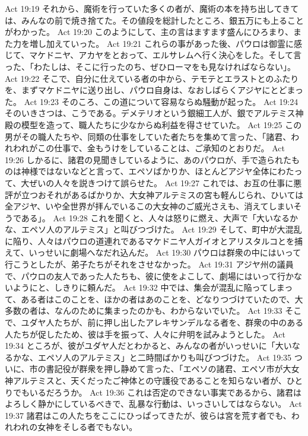 Act 19:19  それから、魔術を行っていた多くの者が、魔術の本を持ち出してきては、みんなの前で焼き捨てた。その値段を総計したところ、銀五万にも上ることがわかった。
Act 19:20  このようにして、主の言はますます盛んにひろまり、また力を増し加えていった。
Act 19:21  これらの事があった後、パウロは御霊に感じて、マケドニヤ、アカヤをとおって、エルサレムへ行く決心をした。そして言った、「わたしは、そこに行ったのち、ぜひローマをも見なければならない」。
Act 19:22  そこで、自分に仕えている者の中から、テモテとエラストとのふたりを、まずマケドニヤに送り出し、パウロ自身は、なおしばらくアジヤにとどまった。
Act 19:23  そのころ、この道について容易ならぬ騒動が起った。
Act 19:24  そのいきさつは、こうである。デメテリオという銀細工人が、銀でアルテミス神殿の模型を造って、職人たちに少なからぬ利益を得させていた。
Act 19:25  この男がその職人たちや、同類の仕事をしていた者たちを集めて言った、「諸君、われわれがこの仕事で、金もうけをしていることは、ご承知のとおりだ。
Act 19:26  しかるに、諸君の見聞きしているように、あのパウロが、手で造られたものは神様ではないなどと言って、エペソばかりか、ほとんどアジヤ全体にわたって、大ぜいの人々を説きつけて誤らせた。
Act 19:27  これでは、お互の仕事に悪評が立つおそれがあるばかりか、大女神アルテミスの宮も軽んじられ、ひいては全アジヤ、いや全世界が拝んでいるこの大女神のご威光さえも、消えてしまいそうである」。
Act 19:28  これを聞くと、人々は怒りに燃え、大声で「大いなるかな、エペソ人のアルテミス」と叫びつづけた。
Act 19:29  そして、町中が大混乱に陥り、人々はパウロの道連れであるマケドニヤ人ガイオとアリスタルコとを捕えて、いっせいに劇場へなだれ込んだ。
Act 19:30  パウロは群衆の中にはいって行こうとしたが、弟子たちがそれをさせなかった。
Act 19:31  アジヤ州の議員で、パウロの友人であった人たちも、彼に使をよこして、劇場にはいって行かないようにと、しきりに頼んだ。
Act 19:32  中では、集会が混乱に陥ってしまって、ある者はこのことを、ほかの者はあのことを、どなりつづけていたので、大多数の者は、なんのために集まったのかも、わからないでいた。
Act 19:33  そこで、ユダヤ人たちが、前に押し出したアレキサンデルなる者を、群衆の中のある人たちが促したため、彼は手を振って、人々に弁明を試みようとした。
Act 19:34  ところが、彼がユダヤ人だとわかると、みんなの者がいっせいに「大いなるかな、エペソ人のアルテミス」と二時間ばかりも叫びつづけた。
Act 19:35  ついに、市の書記役が群衆を押し静めて言った、「エペソの諸君、エペソ市が大女神アルテミスと、天くだったご神体との守護役であることを知らない者が、ひとりでもいるだろうか。
Act 19:36  これは否定のできない事実であるから、諸君はよろしく静かにしているべきで、乱暴な行動は、いっさいしてはならない。
Act 19:37  諸君はこの人たちをここにひっぱってきたが、彼らは宮を荒す者でも、われわれの女神をそしる者でもない。
